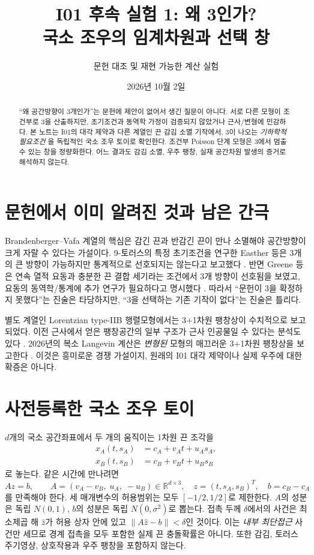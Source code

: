 \documentclass[11pt,a4paper]{article}
\title{I01 후속 실험 1: 왜 3인가?\\국소 조우의 임계차원과 선택 창}
\author{문헌 대조 및 재현 가능한 계산 실험}
\date{2026년 10월 2일}
\begin{document}
\maketitle

\begin{abstract}
``왜 공간방향이 3개인가''는 문헌에 제안이 없어서 생긴 질문이 아니다.
서로 다른 모형이 조건부로 3을 산출하지만, 초기조건과 동역학 가정이
검증되지 않았거나 근사/변형에 민감하다. 본 노트는 I01의 대각 제약과
다른 계열인 끈 감김 소멸 기작에서, 3이 나오는 \emph{기하학적 필요조건}
을 독립적인 국소 조우 토이로 확인한다. 조건부 Poisson 단계 모형은
3에서 멈출 수 있는 창을 정량화한다. 어느 결과도 감김 소멸, 우주 팽창,
실재 공간차원 발생의 증거로 해석하지 않는다.
\end{abstract}

\section{문헌에서 이미 알려진 것과 남은 간극}
Brandenberger--Vafa 계열의 핵심은 감긴 끈과 반감긴 끈이 만나
소멸해야 공간방향이 크게 자랄 수 있다는 가설이다.
9-토러스의 특정 초기조건을 연구한 Easther 등은 3개의 큰 방향이
가능하지만 통계적으로 선호되지는 않는다고 보고했다 \cite{Easther2005}.
반면 Greene 등은 연속 열적 요동과 충분한 끈 결합 세기라는
조건에서 3개 방향이 선호됨을 보였고, 요동의 동역학/통계에
추가 연구가 필요하다고 명시했다 \cite{Greene2013}.
따라서 ``문헌이 3을 확정하지 못했다''는 진술은 타당하지만,
``3을 선택하는 기존 기작이 없다''는 진술은 틀리다.

별도 계열인 Lorentzian type-IIB 행렬모형에서는 3+1차원 팽창상이
수치적으로 보고되었다. 이전 근사에서 얻은 팽창공간의 일부 구조가
근사 인공물일 수 있다는 분석도 있다 \cite{Aoki2019}.
2026년의 복소 Langevin 계산은 \emph{변형된} 모형의 매끄러운
3+1차원 팽창상을 보고한다 \cite{Matrix2026}. 이것은 흥미로운
경쟁 가설이지, 원래의 I01 대각 제약이나 실제 우주에 대한 확증은 아니다.

\section{사전등록한 국소 조우 토이}
$d$개의 국소 공간좌표에서 두 개의 움직이는 1차원 끈 조각을
\begin{align}
x_A(t,s_A)&=c_A+v_A t+u_A s_A,\\
x_B(t,s_B)&=c_B+v_B t+u_B s_B
\end{align}
로 놓는다. 같은 시간에 만나려면
\begin{equation}
A z=b,\qquad
A=(v_A-v_B,\;u_A,\;-u_B)\in\mathbb R^{d\times3},\quad
z=(t,s_A,s_B)^T,\quad b=c_B-c_A
\end{equation}
를 만족해야 한다. 세 매개변수의 허용범위는 모두
$[-1/2,1/2]$로 제한한다. $A$의 성분은 독립 $N(0,1)$,
$b$의 성분은 독립 $N(0,\sigma^2)$로 뽑는다.
접촉 두께 $\delta$에서의 사건은 최소제곱 해 $\hat z$가
허용 상자 안에 있고 $\|A\hat z-b\|<\delta$인 것이다.
이는 \emph{내부 최단접근} 사건만 세므로 경계 접촉을 모두
포함한 실제 끈 충돌확률은 아니다. 또한 감김, 토러스 주기영상,
상호작용과 우주 팽창을 포함하지 않는다.
\end{document}
